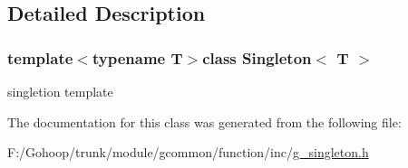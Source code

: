 \subsection{Detailed Description}
\subsubsection*{template$<$typename T$>$class Singleton$<$ T $>$}

singletion template 

The documentation for this class was generated from the following file\-:\begin{DoxyCompactItemize}
\item 
F\-:/\-Gohoop/trunk/module/gcommon/function/inc/\hyperlink{g__singleton_8h}{g\-\_\-singleton.\-h}\end{DoxyCompactItemize}
